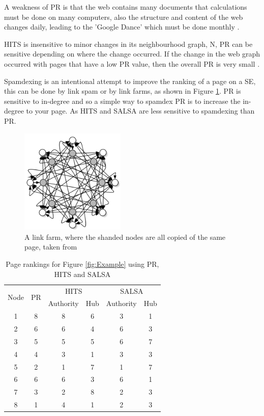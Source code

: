 \documentclass[11pt]{report}
\begin{document}
A weakness of PR is that the web contains many documents that calculations must be done on many computers, also the structure and content of the web changes daily, leading to the 'Google Dance' which must be done monthly \cite{thorson2004modeling}. 

HITS is insensitive to minor changes in its neighbourhood graph, N, PR can be sensitive depending on where the change occurred. If the change in the web graph occurred with pages that have a low PR value, then the overall PR is very small \cite{bonato}.

Spamdexing is an intentional attempt to improve the ranking of a page on a SE, this can be done by link spam or by link farms, as shown in Figure \ref{fig:link farm}. PR is sensitive to in-degree and so a simple way to spamdex PR is to increase the in-degree to your page. \cite{bonato} As HITS and SALSA are less sensitive to spamdexing than PR. 

\begin{figure}[h!]
\centering
\includegraphics[width=5cm]{link_farm_baldi.png}
\caption{A link farm, where the shanded nodes are all copied of the same page, taken from \cite{baldi2003modeling}}
\label{fig:link farm}
\end{figure}

\begin{table}[H] \caption{Page rankings for Figure \ref{fig:Example} using PR, HITS and SALSA }
 \centering
 \begin{tabular} {c| c| c| c| c| c} 
 \multirow{2}{*}{Node} & \multirow{2}{*}{PR} & \multicolumn{2}{|c|}{HITS} & \multicolumn{2}{|c}{SALSA} \\ [0.5ex] 
 {}&{}&Authority & Hub & Authority & Hub\\ 
 \hline
 1&8&8&6&3&1\\
 2&6&6&4&6&3\\
 3&5&5&5&6&7\\
 4&4&3&1&3&3\\
 5&2&1&7&1&7\\
 6&6&6&3&6&1\\
 7&3&2&8&2&3\\
 8&1&4&1&2&3\\
 \end{tabular}
 \label{Table: comparison}
\end{table}
\end{document}
